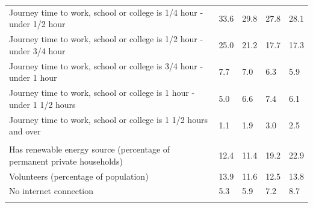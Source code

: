 \documentclass{article}
\begin{document}
\begin{table}[h]
\begin{tabular}{KTTTT}
Journey time to work, school or college is 1/4 hour - under 1/2 hour & 33.6& 29.8& 27.8& 28.1\\
Journey time to work, school or college is 1/2 hour - under 3/4 hour & 25.0& 21.2& 17.7& 17.3\\
Journey time to work, school or college is 3/4 hour - under 1 hour & 7.7& 7.0& 6.3& 5.9\\
Journey time to work, school or college is 1 hour - under 1 1/2 hours & 5.0& 6.6& 7.4& 6.1\\
Journey time to work, school or college is 1 1/2 hours and over & 1.1& 1.9& 3.0& 2.5\\
\hline
    \\ 
    \hline
Has renewable energy source (percentage of permanent private households) & 12.4& 11.4& 19.2& 22.9\\
    \hline
Volunteers (percentage of population) & 13.9& 11.6& 12.5& 13.8\\
    \hline
No internet connection& 5.3& 5.9& 7.2& 8.7\\
\hline
\end{tabular}
\end{table}
\end{document}
